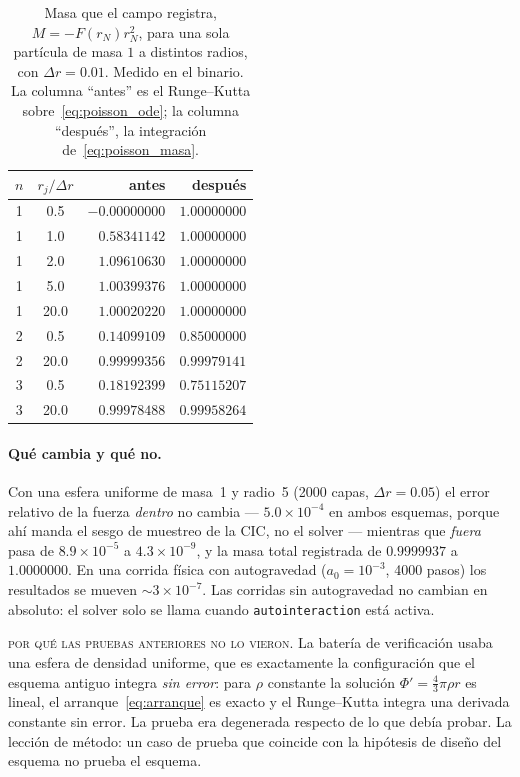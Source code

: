 \documentclass[11pt,a4paper]{article}
\begin{document}
\begin{table}[htbp]
\centering
\caption{Masa que el campo registra, $M=-F(r_N)r_N^{2}$, para una sola partícula de masa
$1$ a distintos radios, con $\Delta r=0.01$. Medido en el binario. La columna
``antes'' es el Runge--Kutta sobre~\eqref{eq:poisson_ode}; la columna ``después'', la
integración de~\eqref{eq:poisson_masa}.}
\label{tab:masapoisson}
\begin{tabular}{ccrr}
\toprule
$n$ & $r_j/\Delta r$ & antes & después \\
\midrule
1 & 0.5  & $-0.00000000$ & $\mathbf{1.00000000}$ \\
1 & 1.0  & $0.58341142$  & $\mathbf{1.00000000}$ \\
1 & 2.0  & $1.09610630$  & $\mathbf{1.00000000}$ \\
1 & 5.0  & $1.00399376$  & $\mathbf{1.00000000}$ \\
1 & 20.0 & $1.00020220$  & $\mathbf{1.00000000}$ \\
\midrule
2 & 0.5  & $0.14099109$  & $0.85000000$ \\
2 & 20.0 & $0.99999356$  & $0.99979141$ \\
3 & 0.5  & $0.18192399$  & $0.75115207$ \\
3 & 20.0 & $0.99978488$  & $0.99958264$ \\
\bottomrule
\end{tabular}
\end{table}

\paragraph{Qué cambia y qué no.} Con una esfera uniforme de masa~1 y radio~5 (2000 capas,
$\Delta r=0.05$) el error relativo de la fuerza \emph{dentro} no cambia --- $5.0\times10^{-4}$
en ambos esquemas, porque ahí manda el sesgo de muestreo de la CIC, no el solver ---
mientras que \emph{fuera} pasa de $8.9\times10^{-5}$ a $4.3\times10^{-9}$, y la masa total
registrada de $0.9999937$ a $1.0000000$. En una corrida física con autogravedad
($a_0=10^{-3}$, 4000 pasos) los resultados se mueven $\sim3\times10^{-7}$. Las corridas
sin autogravedad no cambian en absoluto: el solver solo se llama cuando
\texttt{autointeraction} está activa.

\begin{aviso}
\textsc{por qué las pruebas anteriores no lo vieron.} La batería de verificación usaba
una esfera de densidad uniforme, que es exactamente la configuración que el esquema
antiguo integra \emph{sin error}: para $\rho$ constante la solución $\Phi'=\tfrac43\pi\rho r$
es lineal, el arranque~\eqref{eq:arranque} es exacto y el Runge--Kutta integra una
derivada constante sin error. La prueba era degenerada respecto de lo que debía probar.
La lección de método: un caso de prueba que coincide con la hipótesis de diseño del
esquema no prueba el esquema.
\end{aviso}
\end{document}
